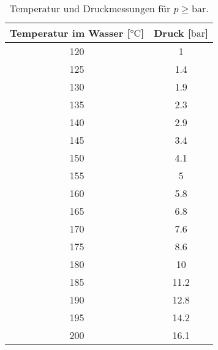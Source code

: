     \begin{table}
        \centering
        \caption{Temperatur und Druckmessungen für $p \geq \si{\bar}$.}
        \label{tab:hdd}
        \begin{tabular}{c c}
            \toprule
            Temperatur im Wasser [$\si{\celsius}$] & Druck [$\si{\bar}$] \\
            \midrule
            120 &    1  \\
            125 &    1.4\\
            130 &    1.9\\
            135 &    2.3\\
            140 &    2.9\\
            145 &    3.4\\
            150 &    4.1\\
            155 &    5\\
            160 &    5.8\\
            165 &    6.8\\
            170 &    7.6\\
            175 &    8.6\\
            180 &    10\\
            185 &    11.2   \\
            190 &    12.8   \\
            195 &    14.2   \\
            200 &    16.1   \\
    
            \bottomrule
        \end{tabular}
        \end{table}